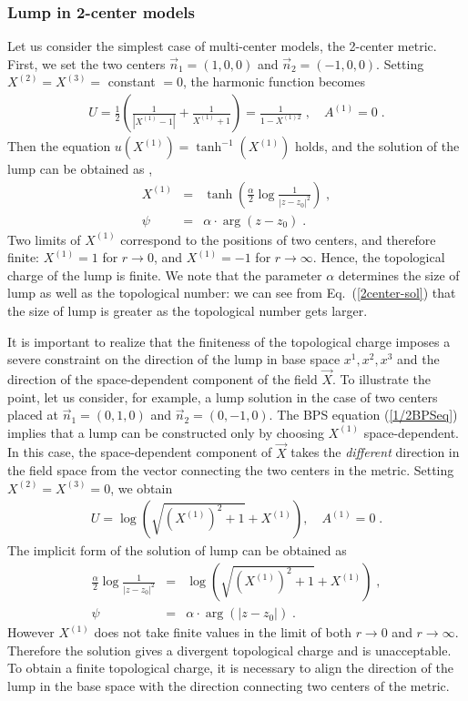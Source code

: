 \documentclass[a4paper,12pt]{article}
\begin{document}
\subsubsection{Lump in 2-center models}
Let us consider the simplest case of multi-center models, 
the 2-center metric. 
First, we set the two centers $\vec{n}_1=(1,0,0)$ and  
$\vec{n}_2=(-1,0,0)$. 
Setting $X^{(2)}=X^{(3)}=$ constant $=0$, 
the harmonic function becomes 
\begin{eqnarray}
  U=\frac{1}{2}\left( \frac{1}{|X^{(1)}-1|}+\frac{1}{X^{(1)}+1}\right)
   = \frac{1}{1-X^{(1)2}} \;, \quad A^{(1)} = 0 \;.
\end{eqnarray}
Then the equation $u(X^{(1)})=\tanh ^{-1} (X^{(1)})$ holds,  
and the solution of the lump 
can be obtained as \cite{Townsend2},
\begin{eqnarray}
  X^{(1)} &=& \tanh \left( \frac{\alpha}{2}\log \frac{1}{|z-z_0|^2}
              \right) \;, \nonumber \\
  \psi &=& \alpha\cdot \arg (z-z_0)\;.
\label{2center-sol}
\end{eqnarray}
Two limits of $X^{(1)}$ correspond to the positions of 
two centers, and therefore finite: $X^{(1)}=1$ for $r\to 0$, 
and $X^{(1)}=-1$ for $r\to \infty$. 
Hence, the topological charge of the lump is finite.
We note that the parameter $\alpha$ determines the size of lump 
as well as the topological number: 
we can see from Eq.~(\ref{2center-sol}) that 
the size of lump is greater 
as the topological number gets larger.  

It is important to realize that the finiteness of the topological charge 
imposes a severe constraint on the direction of the lump in base space 
$x^1, x^2, x^3$ and the direction of the space-dependent component of 
the field $\vec{X}$. 
To illustrate the point, let us consider, 
for example, a lump  solution in the case of two centers placed at 
$\vec{n}_1=(0,1,0)$ and  $\vec{n}_2=(0,-1,0)$.  
The BPS equation (\ref{1/2BPSeq}) implies that a lump can be constructed 
only by choosing $X^{(1)}$ space-dependent. 
In this case, the space-dependent component of $\vec{X}$ takes 
the {\it different} direction in the field space from the vector 
connecting the two centers in the metric. 
Setting $X^{(2)}=X^{(3)}=0$, 
we obtain 
\begin{eqnarray}
 U = \log (\sqrt{(X^{(1)})^2+1}+X^{(1)}), \quad A^{(1)}=0 \;. 
\end{eqnarray}
The implicit form of the solution of lump can be 
obtained as 
\begin{eqnarray}
\frac{\alpha}{2}\log \frac{1}{|z-z_0|^2}
&=& 
\log (\sqrt{(X^{(1)})^2+1}+X^{(1)}) \;,\nonumber \\
\psi &=& \alpha\cdot \arg (|z-z_0|) \;. 
\end{eqnarray}
However $X^{(1)}$ does not take finite values 
in the limit of both $r\to 0$ and $r\to \infty$. 
Therefore the solution gives a divergent topological charge and is 
unacceptable. 
To obtain a finite topological charge, it is necessary to align the 
direction of the lump in the base space with the direction connecting 
two centers of the metric. 
\end{document}
